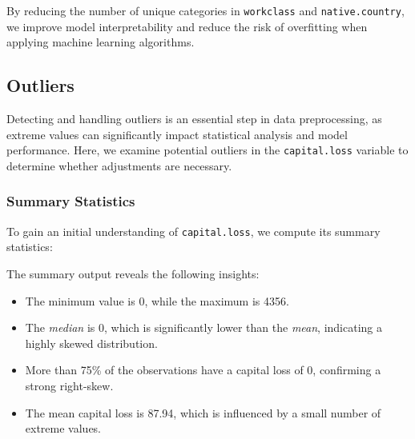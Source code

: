 \documentclass[
  11pt,
]{book}
\makeatletter
\newenvironment{Shaded}{}{}
\newcommand{\DecValTok}[1]{#1}
\newcommand{\FloatTok}[1]{#1}
\newcommand{\FunctionTok}[1]{#1}
\newcommand{\NormalTok}[1]{#1}
\newcommand{\SpecialCharTok}[1]{\textcolor[rgb]{0.39,0.39,0.39}{#1}}
\providecommand{\tightlist}{%
  \setlength{\itemsep}{0pt}\setlength{\parskip}{0pt}}
\newenvironment{kframe}{%
\medskip{}
\setlength{\fboxsep}{.8em}
 \def\at@end@of@kframe{}%
 \ifinner\ifhmode%
  \def\at@end@of@kframe{\end{minipage}}%
  \begin{minipage}{\columnwidth}%
 \fi\fi%
 \def\FrameCommand##1{\hskip\@totalleftmargin \hskip-\fboxsep
 \colorbox{shadecolor}{##1}\hskip-\fboxsep
     \hskip-\linewidth \hskip-\@totalleftmargin \hskip\columnwidth}%
 \MakeFramed {\advance\hsize-\width
   \@totalleftmargin\z@ \linewidth\hsize
   \@setminipage}}%
 {\par\unskip\endMakeFramed%
 \at@end@of@kframe}
\renewenvironment{Shaded}{\begin{kframe}}{\end{kframe}}
\theoremstyle{definition}
\theoremstyle{definition}
\theoremstyle{definition}
\theoremstyle{definition}
\theoremstyle{remark}
\makeatother
\begin{document}
By reducing the number of unique categories in \texttt{workclass} and \texttt{native.country}, we improve model interpretability and reduce the risk of overfitting when applying machine learning algorithms.

\subsection{Outliers}\label{outliers}

Detecting and handling outliers is an essential step in data preprocessing, as extreme values can significantly impact statistical analysis and model performance. Here, we examine potential outliers in the \texttt{capital.loss} variable to determine whether adjustments are necessary.

\subsubsection*{Summary Statistics}\label{summary-statistics}


To gain an initial understanding of \texttt{capital.loss}, we compute its summary statistics:

\begin{Shaded}
\end{Shaded}

The summary output reveals the following insights:

\begin{itemize}
\tightlist
\item
  The minimum value is 0, while the maximum is 4356.\\
\item
  The \emph{median} is 0, which is significantly lower than the \emph{mean}, indicating a highly skewed distribution.\\
\item
  More than 75\% of the observations have a capital loss of 0, confirming a strong right-skew.\\
\item
  The mean capital loss is 87.94, which is influenced by a small number of extreme values.
\end{itemize}
\end{document}
